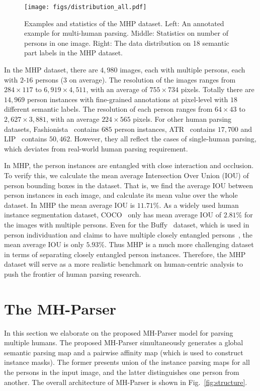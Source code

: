 \documentclass[10pt, letterpaper]{article}
\begin{document}
\begin{figure*}[t!]
    \centering
      \texttt{[image: figs/distribution\_all.pdf]} 
        \caption{Examples and statistics of the MHP dataset. Left: An annotated example for multi-human parsing. Middle: Statistics on number of persons in one image. Right: The data distribution on 18 semantic part labels in the MHP dataset.} \label{fig:num_stats}
\end{figure*}

In the MHP dataset, there are $4{,}980$ images, each with multiple persons, each with $2$-$16$ persons ($3$ on average). The resolution of the images ranges from $284\times 117$ to $6{,}919\times 4{,}511$, with an average of $755\times 734$ pixels. Totally there are $14{,}969$ person instances with fine-grained annotations at pixel-level with $18$ different  semantic labels. The resolution of each person ranges from $64\times 43$ to $2{,}627\times 3{,}881$, with an average $224\times 565$ pixels. For other human parsing datasets, Fashionista~\cite{yamaguchi2012parsing}  contains $685$ person instances, ATR~\cite{liang2015human} contains $17{,}700$ and LIP~\cite{gong2017look}  contains $50{,}462$. However, they all reflect the cases of single-human parsing, which deviates from real-world human parsing requirement. 

In MHP, the person instances are entangled with close interaction and occlusion. To verify this, we calculate the mean average Intersection Over Union (IOU) of person bounding boxes in the dataset. That is, we find the average IOU between person instances in each image, and calculate its mean value over the whole dataset. In MHP the mean average IOU is $11.71\%$. As a widely used  human instance segmentation dataset, COCO~\cite{lin2014microsoft} only has mean average IOU of $2.81\%$ for the images with multiple persons. Even for the Buffy~\cite{vineet2011human} dataset, which is used in person individuation and claims to have multiple closely entangled persons~\cite{jiang2017detangling}, the mean average IOU is only $5.93\%$. Thus  MHP is a much more challenging dataset in terms of separating closely entangled person instances. Therefore, the MHP dataset will serve as a more realistic benchmark on human-centric analysis to push the frontier of human parsing research. 


\section{The MH-Parser}
In this section we elaborate on the proposed MH-Parser model for parsing multiple humans. The proposed MH-Parser simultaneously generates a global semantic parsing map and a pairwise affinity map (which is used to construct instance masks). The former presents  union of the instance parsing maps for all the persons in the input image, and the latter distinguishes one person from another. The overall architecture of MH-Parser is shown in Fig.~\ref{fig:structure}. 
\end{document}
